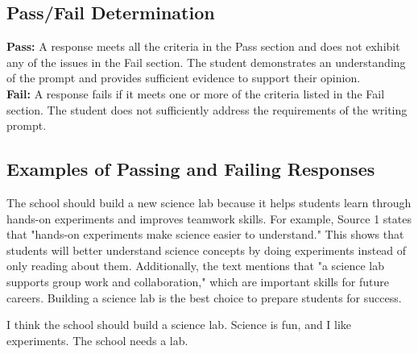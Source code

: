\documentclass[12pt]{article}
\begin{document}
\subsection*{Pass/Fail Determination}

\begin{tcolorbox}[colframe=black!40, colback=white, title=How to Determine Pass or Fail]
\textbf{Pass:} A response meets all the criteria in the Pass section and does not exhibit any of the issues in the Fail section. The student demonstrates an understanding of the prompt and provides sufficient evidence to support their opinion. \\
\textbf{Fail:} A response fails if it meets one or more of the criteria listed in the Fail section. The student does not sufficiently address the requirements of the writing prompt.
\end{tcolorbox}

\subsection*{Examples of Passing and Failing Responses}

\begin{tcolorbox}[colframe=black!40, colback=green!5, title=Example of a Passing Response]
The school should build a new science lab because it helps students learn through hands-on experiments and improves teamwork skills. For example, Source 1 states that "hands-on experiments make science easier to understand." This shows that students will better understand science concepts by doing experiments instead of only reading about them. Additionally, the text mentions that "a science lab supports group work and collaboration," which are important skills for future careers. Building a science lab is the best choice to prepare students for success.
\end{tcolorbox}

\begin{tcolorbox}[colframe=black!40, colback=red!5, title=Example of a Failing Response]
I think the school should build a science lab. Science is fun, and I like experiments. The school needs a lab. 
\end{tcolorbox}
\end{document}
